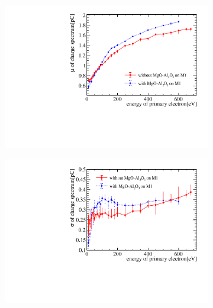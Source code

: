 \begin{figure}[!ht]
	\centering
	\begin{subfigure}[b]{0.45\textwidth}
		\centering
		\includegraphics[width=\textwidth]{PMTRelated/GTmodel/gain_mu.pdf}
		\caption{}
		\label{fig:gain}
	\end{subfigure}%
	\begin{subfigure}[b]{0.45\textwidth}
		\centering
		\includegraphics[width=\textwidth]{PMTRelated/GTmodel/gain_sigma.pdf}
		\caption{}
		\label{fig:sigma}
	\end{subfigure}
	\hfill
	\begin{subfigure}[b]{0.45\textwidth}
		\centering

\end{subfigure}
\end{figure}
